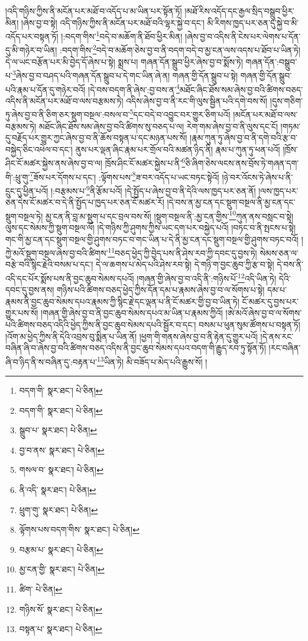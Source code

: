 །འདི་གཉིས་ཀྱིས་ནི་མངོན་པར་མཐོ་བ་འདོད་པ་མ་ཡིན་པར་སྟོན་ཏོ། །མཐོ་རིས་འདོད་དང་རྒྱལ་སྲིད་བསྒྲུབ་ཕྱིར་མིན། །ཞེས་བྱ་བ་སྟེ། འདི་གཉིས་ཀྱིས་ནི་མངོན་པར་མཐོ་བའི་ལྷར་སྐྱེ་བ་དང་། མི་རིགས་ཁྱད་པར་ཅན་དུ་སྐྱེ་བ་མི་འདོད་པར་བསྟན་ཏོ། །:བདག་གིས་\footnote{བདག་གི་  སྣར་ཐང་།  པེ་ཅིན། }བདེ་བ་མཆོག་ནི་ཐོབ་ཕྱིར་མིན། །ཞེས་བྱ་བ་འདིས་ནི་ངེས་པར་ལེགས་པ་དོན་དུ་མི་གཉེར་བ་ཡིན། :བདག་གིས་\footnote{བདག་གི་  སྣར་ཐང་།  པེ་ཅིན། }བདེ་བ་མཆོག་ཅེས་བྱ་བ་ནི་བདག་བདེ་བ་མྱ་ངན་ལས་འདས་པ་ཐོབ་པ་ཡིན་ཏེ། དེ་ལ་ཡང་བརྩོན་པར་མི་བྱེད་དོ་ཞེས་པ་སྟེ། སྨྲས་པ། གཞན་དོན་སྒྲུབ་ཕྱིར་ཞེས་བྱ་བ་སྨོས་ཏེ། གཞན་དོན་:བསྒྲུབ་པ་\footnote{སྒྲུབ་པ་  སྣར་ཐང་།  པེ་ཅིན། }ཞེས་བྱ་བ་བཤད་པའི་གཞན་དོན་སྒྲུབ་པ་དེ་གང་ཡིན་ཞེ་ན། གཞན་གྱི་དོན་སྒྲུབ་པ་སྟེ། གཞན་གྱི་དོན་སྒྲུབ་པའི་རྣམ་པ་དོན་དུ་གཉེར་བའོ། །དེ་བས་བདག་ནི་ཞེས་:བྱ་བས་ན་\footnote{བྱ་བ་ནས་  སྣར་ཐང་།  པེ་ཅིན། }མཐོང་ཞིང་ཐོས་སམ་ཞེས་བྱ་བའི་ཚིགས་བཅད་འདིས་ནི་མངོན་པར་མཐོ་བ་ལས་བརྩམས་ཏེ། འདིས་ཞེས་བྱ་བ་ནི་རང་གི་ལུས་སྦྱིན་པའི་དགེ་བས་སོ། །དུས་གཅིག་ཏུ་ཞེས་བྱ་བ་ནི་ཅིག་ཅར་སྡུག་བསྔལ་:བསལ་བ་\footnote{གསལ་བ་  སྣར་ཐང་།  པེ་ཅིན། }དང་བདེ་བ་འབྱུང་བར་གྱུར་ཅིག་པའོ། །མངོན་པར་མཐོ་བ་ལས་བརྩམས་ཏེ། མཐོང་ཞིང་ཐོས་སམ་ཞེས་བྱ་བའི་ཚིགས་སུ་བཅད་པ་ལ། རེག་གམ་ཞེས་བྱ་བ་ནི་ལུས་དང་ངོ། །གཏམ་དུ་བརྗོད་པར་གྱུར་ཀྱང་ཞེས་བྱ་བ་ནི་ཆོས་བསྟན་པ་དང་མཉན་པས་སོ། །རྣམ་ཀུན་ཏུ་ཞེས་བྱ་བ་ནི་དགེ་བའི་རྩ་བ་བསྐྱེད་ཅིང་འཕེལ་བ་དང་། ནུས་པར་ལྡན་ཞིང་རྣམ་པར་གྲོལ་བའི་མཚན་ཉིད་ནི། རྣམ་པ་ཀུན་ཏུ་ཕན་པའོ། །ཁྲོས་ཤིང་ངོ་མཚར་སྐྱེས་ནས་ཞེས་བྱ་བ་ལ། ཁྲོས་ཤིང་ངོ་མཚར་སྐྱེས་པ་ནི་\footnote{ནི་འདི་  སྣར་ཐང་།  པེ་ཅིན། }ཅི་ཞིག་ཅེས་ལངས་ནས་བྲོས་ཏེ་གཞན་དག་གི་:ཕྲུ་གུ་\footnote{ཕྲུག་གུ་  སྣར་ཐང་།  པེ་ཅིན། }ཟོས་པར་དོགས་པ་དང་། :ལྟོགས་པས་\footnote{ལྟོགས་པས་བདག་གིས་  སྣར་ཐང་།  པེ་ཅིན། }ཟ་བར་འདོད་པ་ཡང་བཏང་སྟེའོ། །ཉེ་བར་འོངས་ཏེ་ཞེས་པ་ནི་དྲུང་དུ་ཕྱིན་པའོ། །:བརྩམས་པ་\footnote{བརྩམ་པ་  སྣར་ཐང་།  པེ་ཅིན། }ནི་རྩོམ་པའོ། །དེ་སྤྱོད་པ་ཞེས་བྱ་བ་ནི་དེའི་ལས་ཁྱད་པར་ཅན་ནོ། །ལས་ཁྱད་པར་ཅན་དེས་ངོ་མཚར་བ་དེ་ནི་སྤྱོད་པ་ཁྱད་པར་ཅན་ངོ་མཚར་རོ། །དེ་བས་ན་མྱ་ངན་དང་སྡུག་བསྔལ་ནི་མྱ་ངན་དང་སྡུག་བསྔལ་ཏེ། མྱ་ངན་ནི་བླ་མ་སྡུག་པ་དང་བྲལ་བས་སོ། །སྡུག་བསྔལ་ནི་:མྱ་ངན་གྱིས་\footnote{མྱ་ངན་གྱི་  སྣར་ཐང་།  པེ་ཅིན། }ཀུན་ནས་བསླང་བ་སྟེ། ལུས་དང་སེམས་ཀྱི་སྡུག་བསྔལ་ལོ། །དེ་གཉིས་ཀྱི་ཤུགས་ཀྱིས་ཡང་དག་པར་བསྐྱེད་པའོ། །བཏང་བ་ནི་སྤངས་པ་སྟེ། གང་གི་མྱ་ངན་དང་སྡུག་བསྔལ་གྱི་ཤུགས་བཏང་བ་གང་ཡིན་པ་དེ་ནི་མྱ་ངན་དང་སྡུག་བསྔལ་གྱི་ཤུགས་བཏང་བའོ། །ཀྱེ་མའོ་སྡུག་བསྔལ་ཞེས་བྱ་བའི་ཚིགས་\footnote{ཚིག་  པེ་ཅིན། }བཅད་ཕྱེད་ཀྱི་བྱེད་པས་ནི་ཤེས་རབ་ཀྱི་དབང་དུ་བྱས་ཏེ། སེམས་ཅན་ལ་བརྩེ་བའི་སྙིང་རྗེའི་བསམ་པ་དང་། དེ་ལ་ཆགས་པ་མེད་པའི་ཤེས་རབ་སྟེ། དེ་གཉི་ག་བྱང་ཆུབ་ཀྱི་རྩ་བ་སྟེ། དེ་བས་ནི་འདི་དང་པོར་སྨོས་པས་ནི་བྱང་ཆུབ་སེམས་དཔའོ། །གཞན་གྱི་ཞེས་བྱ་བ་འདི་ནི་:གཉིས་པོ་\footnote{གཉིས་སོ་  སྣར་ཐང་།  པེ་ཅིན། }འདི་ཡིན་ཏེ། དེའི་དབང་དུ་བྱས་ནས། གཉིས་པའི་ཚིགས་བཅད་ཕྱེད་ཀྱིས་དོན་དམ་པ་རྣམས་ཞེས་བྱ་བ་ལ་སོགས་པ་སྟེ། དམ་པ་རྣམས་ནི་བྱང་ཆུབ་སེམས་དཔའ་རྣམས་ཀྱི་སྙིང་རྗེ་དང་ལྡན་པ་ནི་ངོ་མཚར་གྱི་བྱ་བ་ཡིན་ཏེ། ངོ་མཚར་དུ་བྱས་པར་གྱུར་པས་སོ། །གཞན་གྱི་ཞེས་བྱ་བ་ནི་བྱང་ཆུབ་སེམས་དཔའ་མ་ཡིན་པ་རྣམས་ཀྱིའོ། །ཨེ་མའོ་ཞེས་བྱ་བ་ལ་སོགས་པའི་ཚིགས་བཅད་འདིའི་ཕྱེད་ཀྱིས་ནི་བྱང་ཆུབ་སེམས་དཔའི་སྦྱོར་བ་དང་། བསམ་པ་ཕུན་སུམ་ཚོགས་པ་བསྟན་ཏོ། །འོག་མ་ཕྱེད་ཀྱིས་ནི་དེའི་འབྲས་བུ་སྨིན་པ་ཡིན་ནོ། །ཕྱག་གི་གནས་ཞེས་བྱ་བ་ནི་རྟེན་དུ་གྱུར་པའོ། །དེ་ནས་རང་བཞིན་ཞི་བ་ཞེས་བྱ་བའི་ཚིགས་བཅད་འདིས་ནི་བྱང་ཆུབ་སེམས་དཔའ་བདག་གི་རྒྱུད་རབ་ཏུ་སྟོན་ཏོ། །རང་བཞིན་ཞི་བ་ཉིད་ནི་ས་བཞིན་དུ་:བརྟན་པ་\footnote{བསྟན་པ་  སྣར་ཐང་།  པེ་ཅིན། }ཡིན་ཏེ། མི་བཟོད་པ་མེད་པའི་རྒྱུས་སོ། །
